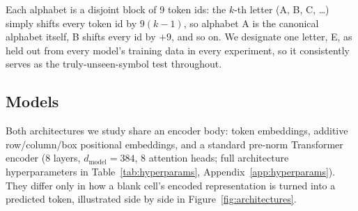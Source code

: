 \documentclass{article} %
\begin{document}
Each alphabet is a disjoint block of 9 token ids: the $k$-th letter (A,
B, C, \ldots) simply shifts every token id by $9(k-1)$, so alphabet A is
the canonical alphabet itself, B shifts every id by $+9$, and so on. We
designate one letter, E, as held out from every model's training data in
every experiment, so it consistently serves as the truly-unseen-symbol
test throughout.

\subsection{Models}

Both architectures we study share an encoder body:
token embeddings, additive row/column/box positional
embeddings, and a standard
pre-norm Transformer encoder \citep{vaswani2017attention} (8 layers,
$d_{\text{model}}=384$, 8 attention heads; full architecture
hyperparameters in Table~\ref{tab:hyperparams}, Appendix~\ref{app:hyperparams}).
They differ only in how a blank cell's encoded
representation is turned into a predicted token, illustrated side by
side in Figure~\ref{fig:architectures}.
\end{document}
